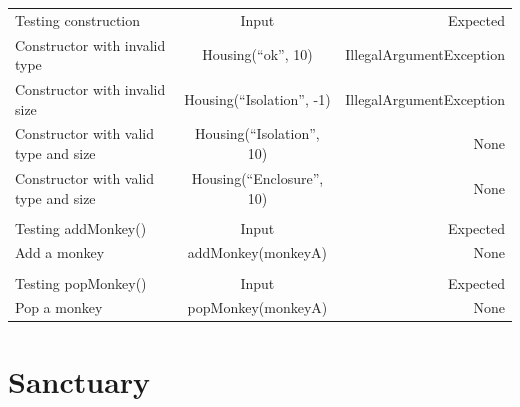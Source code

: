\documentclass[12pt]{amsart}
\begin{document}
\begin{table}[htbp]
   \begin{tabular}{@{} lcr @{}} %

      Testing construction      & Input & Expected \\
         Constructor with invalid type       & Housing(``ok'', 10)     &  IllegalArgumentException \\
         Constructor with invalid size       & Housing(``Isolation'', -1)     &  IllegalArgumentException \\
         Constructor with valid type and size       & Housing(``Isolation'', 10)     &  None \\
         Constructor with valid type and size       & Housing(``Enclosure'', 10)     &  None \\
          & & \\
       Testing addMonkey() & Input & Expected \\
       Add a monkey & addMonkey(monkeyA) & None\\
          & & \\
       Testing popMonkey() & Input & Expected \\
       Pop a monkey & popMonkey(monkeyA) & None\\
    \end{tabular}
\end{table}

\section{Sanctuary}
\end{document}
